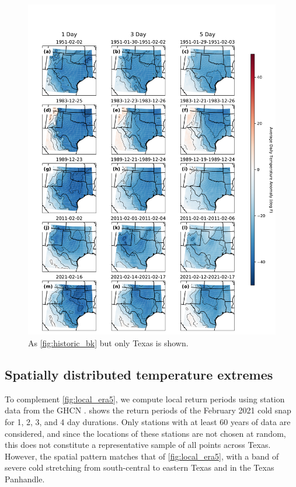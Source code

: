 \documentclass[12pt]{iopart}
\begin{document}
\begin{figure}
  \centering
  \includegraphics[width=\textwidth]{historic_events_era5_TX.pdf}
  \caption{
    As \cref{fig:historic_bk} but only Texas is shown.
  }\label{fig:historic_tx}
\end{figure}

\subsection{Spatially distributed temperature extremes}

To complement \cref{fig:local_era5}, we compute local return periods using station data from the GHCN \cite{Menne:2012hk}.
 shows the return periods of the February 2021 cold snap for 1, 2, 3, and 4 day durations.
Only stations with at least 60 years of data are considered, and since the locations of these stations are not chosen at random, this does not constitute a representative sample of all points across Texas.
However, the spatial pattern matches that of \cref{fig:local_era5}, with a band of severe cold stretching from south-central to eastern Texas and in the Texas Panhandle.
\end{document}
